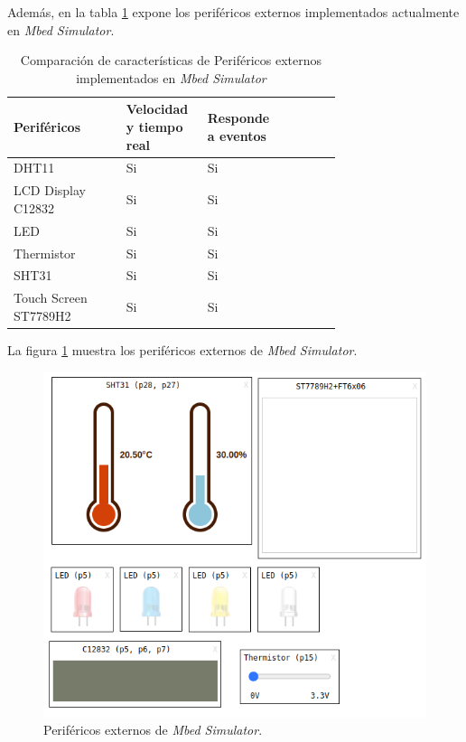 Además, en la tabla \ref{tab:perifericosExternosMBED} expone los  periféricos externos implementados actualmente en \textit{Mbed Simulator}.


\begin{table}[h]
\centering
\caption[Comparación de características de Periféricos externos implementados en \textit{Mbed Simulator}]{Comparación de características de Periféricos externos implementados en \textit{Mbed Simulator}}
\begin{tabular}{p{0.30\linewidth} p{0.14\linewidth}  p{0.14\linewidth}  p{0.14\linewidth}}
\toprule
\textbf{Periféricos} 
& \textbf{Velocidad y tiempo real}
& \textbf{Responde a eventos}
\\
\midrule
DHT11 & Si & Si  \\
LCD Display C12832 & Si & Si  \\
LED & Si & Si \\
Thermistor & Si & Si \\
SHT31 & Si & Si \\
Touch Screen ST7789H2 & Si & Si \\
\bottomrule
\hline
\end{tabular}
\label{tab:perifericosExternosMBED}
\end{table}

La figura \ref{fig:perifericosMbed} muestra los periféricos externos de \textit{Mbed Simulator}.
\hfill \break
\hfill \break
\hfill \break
\hfill \break
\hfill \break

\begin{figure}[ht]
	\centering
	\includegraphics[scale=.81]{./Figures/perifericosMBED.png}
	\caption{Periféricos externos de \textit{Mbed Simulator}.}
	\label{fig:perifericosMbed}
\end{figure}

